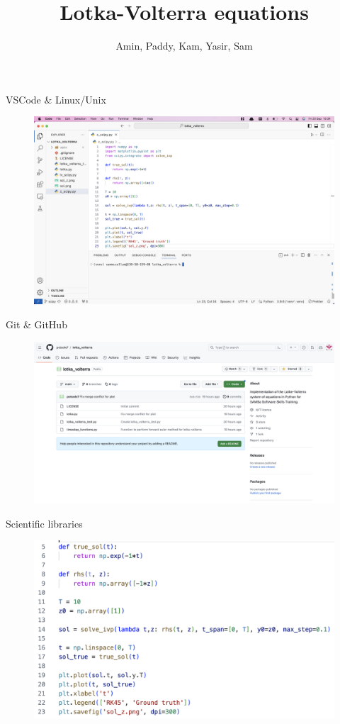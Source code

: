 \documentclass{beamer}
\title{\textbf{Lotka-Volterra equations}}
\author{Amin, Paddy, Kam, Yasir, Sam}
\begin{document}
    \titlepage
    
    \begin{frame}{VSCode \& Linux/Unix}
        \begin{figure}
            \centering
            \includegraphics[width=\textwidth]{vscode.png}
            \label{fig:vscode}
        \end{figure}
    \end{frame}

    \begin{frame}{Git \& GitHub}
        \begin{figure}
            \centering
            \includegraphics[width=\textwidth]{github.png}
            \label{fig:github}
        \end{figure}
    \end{frame}

    \begin{frame}{Scientific libraries}
        \begin{figure}
            \centering
            \includegraphics[width=\textwidth]{scientific-libraries.png}
            \label{fig:scilib}
        \end{figure}
    \end{frame}
    
\end{document}
